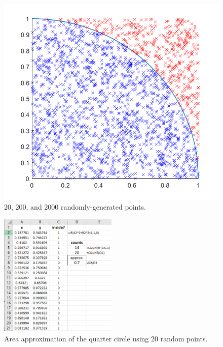 \begin{figure}[htbp]
\begin{minipage}{0.3\textwidth}
    \end{minipage}
    \hfill
    \begin{minipage}{0.3\textwidth}
        \centering
	\includegraphics[width=\linewidth]{fig/4_quartercircle_3plot.png}
    \end{minipage}	
    \caption{20, 200, and 2000 randomly-generated points. \label{fig:4_quartercircleplots}}
\end{figure}

\newpage

\begin{figure}[htbp]
	\centering
	\includegraphics[width=0.5\textwidth]{fig/4_quartercircle_1.png}
	\caption{Area approximation of the quarter circle using 20 random points. \label{fig:4_quartercircle_1}}
\end{figure}


